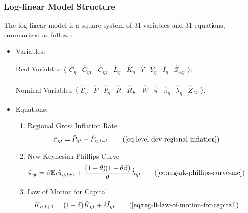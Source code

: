 \documentclass[
thesis.tex
]{subfiles}
\begin{document}
\newpage


\subsubsection{Log-linear Model Structure}

The log-linear model is a square system of 31 variables and 31 equations, summarized as follows:

{\singlespacing

\begin{itemize}
	
	\item Variables:
	
	Real Variables: $\langle \begin{smallmatrix} \hat{C}_{\eta} & \hat{C}_{\eta 1} & \hat{C}_{\eta 2} & \hat{L}_{\eta} & \hat{K}_{\eta} & \hat{Y} & \hat{Y}_{\eta} & \hat{I}_{\eta} & \hat{Z}_{A\eta} \end{smallmatrix} \rangle$;
	
	Nominal Variables: $\langle \begin{smallmatrix} \hat{\mathscr{E}}_{\eta} & \hat{P} & \hat{P}_{\eta} & \hat{R} & \hat{R}_{K} & \hat{W} & \hat{\pi} & \hat{\pi}_{\eta} & \hat{\lambda}_{\eta} & \hat{Z}_M \end{smallmatrix} \rangle$.
	
	\item Equations:
	
	\begin{enumerate}
		
		\item Regional Gross Inflation Rate
		\begin{align}
			\hat{\pi}_{\eta t} &= \hat{P}_{\eta t} - \hat{P}_{\eta, t-1} \tag{\ref{eq:level-dev-regional-inflation}}
		\end{align}
		
		\item New Keynesian Phillips Curve
		\begin{align}
			\hat{\pi}_{\eta t} &= \beta \E \hat{\pi}_{\eta, t+1} + \frac{(1-\theta) (1- \theta \beta)}{\theta} \hat{\lambda}_{\eta t} \tag{\ref{eq:reg-nk-phillips-curve-mc}}
		\end{align}
		
		\item Law of Motion for Capital
		\begin{alignat}{2}
			\hat{K}_{\eta, t+1} &= (1-\delta) \hat{K}_{\eta t} + \delta \hat{I}_{\eta t} \tag{\ref{eq:reg-ll-law-of-motion-for-capital}}
		\end{alignat}
		

\end{enumerate}
\end{itemize}}
\end{document}
